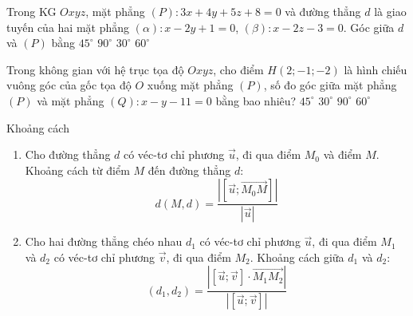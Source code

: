 	\begin{ex}%
	Trong KG $Oxyz$, mặt phẳng $(P) \colon 3x+4y+5z+8=0$ và đường thẳng $d$ là giao tuyến của hai mặt phẳng $(\alpha) \colon x-2y+1=0$, $(\beta) \colon x-2z-3=0$. Góc giữa $d$ và $(P)$ bằng
	\choice
	{$45^\circ$}
	{$90^\circ$}
	{$30^\circ$}
	{\True $60^\circ$}
	\end{ex}
	\begin{ex}%
	Trong không gian với hệ trục tọa độ $Oxyz$, cho điểm $H(2;-1;-2)$ là hình chiếu vuông góc của gốc tọa độ $O$ xuống mặt phẳng $(P)$, số đo góc giữa mặt phẳng $(P)$ và mặt phẳng $(Q)\colon x-y-11=0$ bằng bao nhiêu?
	\choice
	{\True $45^\circ$}
	{$30^\circ$}
	{$90^\circ$}
	{$60^\circ$}
	\end{ex}
	\begin{dang}{Khoảng cách}%
	\begin{enumerate}
	\item Cho đường thẳng $d$ có véc-tơ chỉ phương $\vec{u}$, đi qua điểm $M_0$ và điểm $ M $. Khoảng cách từ điểm $ M $ đến đường thẳng $ d $:
	$$ d\left(M,d\right)=\dfrac{|\left[\vec{u};\vec{M_0M}\right]|}{|\vec{u}|}$$
	\item Cho hai đường thẳng chéo nhau $d_1$ có véc-tơ chỉ phương $\vec{u}$, đi qua điểm $M_1 $ và $d_2$ có véc-tơ chỉ phương $\vec{v}$, đi qua điểm $M_2$. Khoảng cách giữa $ d_1 $ và $ d_2 $:
	$$\left(d_1,d_2\right)=\dfrac{\left|\left[\vec{u};\vec{v}\right]\cdot\vec{M_1M_2}\right|}{|\left[\vec{u};\vec{v}\right]|}$$
	\end{enumerate}
\end{dang}
\setcounter{subsubsection}{0}
\setcounter{vd}{0}
\setcounter{ex}{0}

